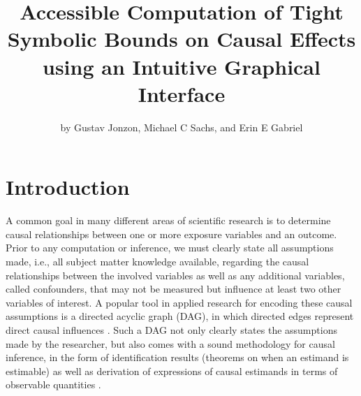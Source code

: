 \title{Accessible Computation of Tight Symbolic Bounds on Causal Effects using an Intuitive Graphical Interface}


\author{by Gustav Jonzon, Michael C Sachs, and Erin E Gabriel}

\maketitle


\hypertarget{introduction}{%
\section{Introduction}\label{introduction}}

A common goal in many different areas of scientific research is to determine causal relationships between one or more exposure variables and an outcome. Prior to any computation or inference, we must clearly state all assumptions made, i.e., all subject matter knowledge available, regarding the causal relationships between the involved variables as well as any additional variables, called confounders, that may not be measured but influence at least two other variables of interest. A popular tool in applied research for encoding these causal assumptions is a directed acyclic graph (DAG), in which directed edges represent direct causal influences \citep{greenland1999causal}. Such a DAG not only clearly states the assumptions made by the researcher, but also comes with a sound methodology for causal inference, in the form of identification results (theorems on when an estimand is estimable) as well as derivation of expressions of causal estimands in terms of observable quantities \citep{pearl2009causality}.

